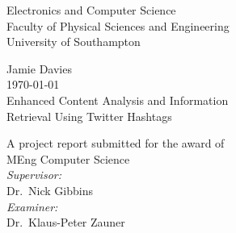 \documentclass[11pt,a4paper]{report}
\begin{document}
\listoftodos
\pagebreak

\begin{titlepage}
\center
\vspace*{3cm}

{\Large
    Electronics and Computer Science\\
    Faculty of Physical Sciences and Engineering\\
    University of Southampton\\[1cm]
}

Jamie Davies\\
\today\\[1cm]

{\large
    Enhanced Content Analysis and Information\\
    Retrieval Using Twitter Hashtags\\[1cm]
}

A project report submitted for the award of\\
MEng Computer Science\\[1cm]

\emph{Supervisor:}\\
Dr.\ Nick Gibbins\\[0.5cm]

\emph{Examiner:}\\
Dr.\ Klaus-Peter Zauner\\


\vfill
\end{titlepage}

\end{document}
